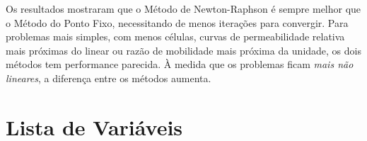 \documentclass[final,5p]{elsarticle}
\numberwithin{equation}{section}
\begin{document}
            Os resultados mostraram que o Método de Newton-Raphson é sempre melhor que o Método do Ponto Fixo, necessitando de menos iterações para convergir. Para problemas mais simples, com menos células, curvas de permeabilidade relativa mais próximas do linear ou razão de mobilidade mais próxima da unidade, os dois métodos tem performance parecida. À medida que os problemas ficam \emph{mais não lineares}, a diferença entre os métodos aumenta.



\appendix

\section{Lista de Variáveis}
\end{document}
